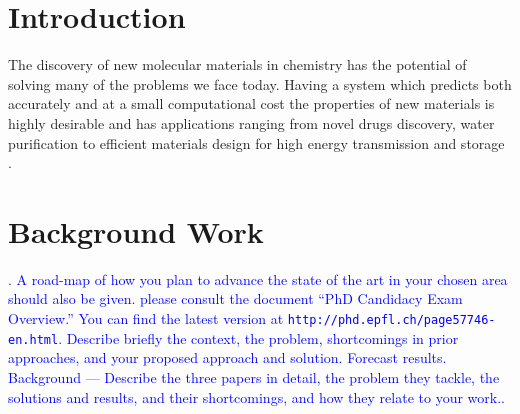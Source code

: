 \documentclass[10pt,journal,a4paper]{IEEEtran}
\begin{document}
\IEEEpeerreviewmaketitle


\section{Introduction}

The discovery of new molecular materials in chemistry has the potential of solving many of the problems we face today.
Having a system which predicts both accurately and at a small computational cost the properties of new materials is highly desirable and has applications ranging from novel drugs discovery, water purification to efficient materials design for high energy transmission and storage \cite{cleanenergy}.
 
\section{Background Work}
\textcolor{blue}{
. A road-map of how you plan to
advance the state of the art in your chosen area should also be given.
 please consult the document ``PhD Candidacy Exam Overview.'' You can find the latest
version at {\tt http://phd.epfl.ch/page57746-en.html}.
Describe briefly the context, the problem, shortcomings in prior
approaches, and your proposed approach and solution. Forecast results.
Background --- Describe the three papers in detail, the problem they
tackle, the solutions and results, and their shortcomings, and how they
relate to your work..}


%
%
\end{document}
